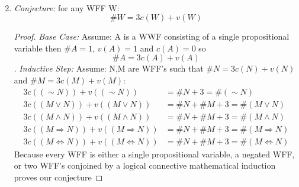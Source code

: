 \documentclass[11pt] {article}
\begin{document}
\begin{enumerate}
\begin{enumerate}
\[\begin{array}{LLLL}
\end{array}
\]
\end{enumerate}
\item
\textit{Conjecture:} for any WFF W:$$\#W = 3c(W) + v(W) $$
\begin{proof}
\textit{Base Case:} \newline Assume: A is a WWF consisting of a single propositional variable then $\#A = 1$, $v(A) = 1$ and  $c(A) = 0$ so $$\#A = 3c(A) + v(A)$$. \newline
\textit{Inductive Step:} \newline Assume: N,M are WFF's such that $\#N = 3c(N) + v(N)$ and $\#M = 3c(M) + v(M)$:
\begin{align*}
3c((\sim N)) + v((\sim N)) & =  \#N + 3 =  \#(\sim N)\\
3c((M \lor N)) + v((M \lor N)) & = \#N + \#M + 3 =  \#(M \lor N)\\
3c((M \land N)) + v((M \land N)) & = \#N + \#M + 3 =  \#(M \land N)\\
3c((M \Rightarrow N)) + v((M \Rightarrow N)) & = \#N + \#M + 3 =  \#(M \Rightarrow N)\\
3c((M \Leftrightarrow N)) + v((M \Leftrightarrow N)) & = \#N + \#M + 3 =  \#(M \Leftrightarrow N)
\end{align*} 
Because every WFF is either a single propositional variable, a negated WFF, or two WFF's conjoined by a logical connective mathematical induction proves our conjecture  
 

\end{proof}
\end{enumerate}
\end{document}
